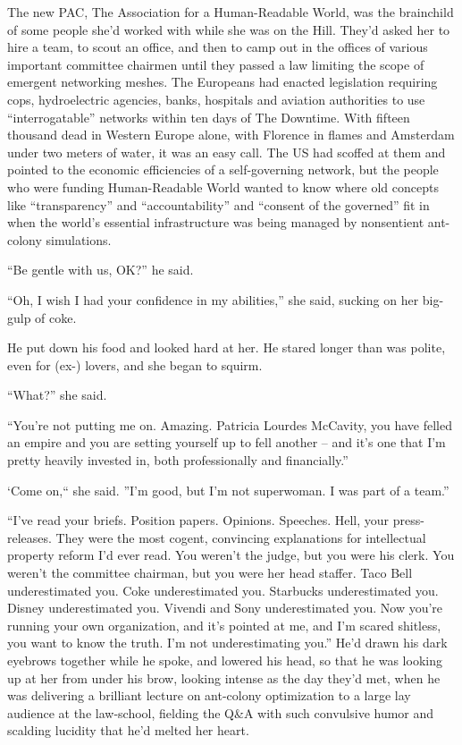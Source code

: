 The new PAC, The Association for a Human-Readable World, was the 
brainchild of some people she'd worked with while she was on the Hill. 
They'd asked her to hire a team, to scout an office, and then to camp 
out in the offices of various important committee chairmen until they 
passed a law limiting the scope of emergent networking meshes. The 
Europeans had enacted legislation requiring cops, hydroelectric 
agencies, banks, hospitals and aviation authorities to use 
“interrogatable” networks within ten days of The Downtime. With 
fifteen thousand dead in Western Europe alone, with Florence in flames 
and Amsterdam under two meters of water, it was an easy call. The US 
had scoffed at them and pointed to the economic efficiencies of a 
self-governing network, but the people who were funding Human-Readable 
World wanted to know where old concepts like “transparency” and 
“accountability” and “consent of the governed” fit in when the 
world's essential infrastructure was being managed by nonsentient 
ant-colony simulations.

“Be gentle with us, OK?” he said.

“Oh, I wish I had your confidence in my abilities,” she said, 
sucking on her big-gulp of coke.

He put down his food and looked hard at her. He stared longer than was 
polite, even for (ex-) lovers, and she began to squirm.

“What?” she said.

“You're not putting me on. Amazing. Patricia Lourdes McCavity, you 
have felled an empire and you are setting yourself up to fell another 
-- and it's one that I'm pretty heavily invested in, both 
professionally and financially.”

`Come on,“ she said. ”I'm good, but I'm not superwoman. I was part 
of a team.”

“I've read your briefs. Position papers. Opinions. Speeches. Hell, 
your press-releases. They were the most cogent, convincing explanations 
for intellectual property reform I'd ever read. You weren't the judge, 
but you were his clerk. You weren't the committee chairman, but you 
were her head staffer. Taco Bell underestimated you. Coke 
underestimated you. Starbucks underestimated you. Disney underestimated 
you. Vivendi and Sony underestimated you. Now you're running your own 
organization, and it's pointed at me, and I'm scared shitless, you want 
to know the truth. I'm not underestimating you.” He'd drawn his dark 
eyebrows together while he spoke, and lowered his head, so that he was 
looking up at her from under his brow, looking intense as the day 
they'd met, when he was delivering a brilliant lecture on ant-colony 
optimization to a large lay audience at the law-school, fielding the 
Q{\&}A with such convulsive humor and scalding lucidity that he'd 
melted her heart.

